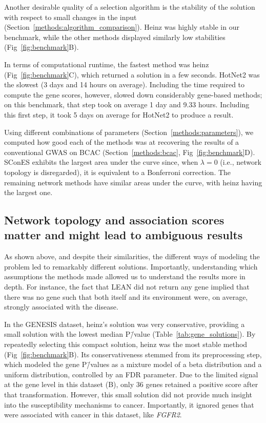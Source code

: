 \documentclass[10pt,letterpaper]{article}
\begin{document}
Another desirable quality of a selection algorithm is the stability of the solution with respect to small changes in the input (Section~\ref{methods:algorithm_comparison}). Heinz was highly stable in our benchmark, while the other methods displayed similarly low stabilities (Fig~\ref{fig:benchmark}B).

In terms of computational runtime, the fastest method was heinz (Fig~\ref{fig:benchmark}C), which returned a solution in a few seconds. HotNet2 was the slowest (3 days and 14 hours on average). Including the time required to compute the gene scores, however, slowed down considerably gene-based methods; on this benchmark, that step took on average 1 day and 9.33 hours. Including this first step, it took 5 days on average for HotNet2 to produce a result.

Using different combinations of parameters (Section~\ref{methods:parameters}), we computed how good each of the methods was at recovering the results of a conventional GWAS on BCAC (Section~\ref{methods:bcac}, Fig~\ref{fig:benchmark}D). SConES exhibits the largest area under the curve since, when $\lambda = 0$ (i.e., network topology is disregarded), it is equivalent to a Bonferroni correction. The remaining network methods have similar areas under the curve, with heinz having the largest one.

\subsection{Network topology and association scores matter and might lead to ambiguous results}
\label{results:drawbacks}

As shown above, and despite their similarities, the different ways of modeling the problem led to remarkably different solutions. Importantly, understanding which assumptions the methods made allowed us to understand the results more in depth. For instance, the fact that LEAN did not return any gene implied that there was no gene such that both itself and its environment were, on average, strongly associated with the disease.

In the GENESIS dataset, heinz's solution was very conservative, providing a small solution with the lowest median P\=/value (Table~\ref{tab:gene_solutions}). By repeatedly selecting this compact solution, heinz was the most stable method (Fig~\ref{fig:benchmark}B). Its conservativeness stemmed from its preprocessing step, which modeled the gene P\=/values as a mixture model of a beta distribution and a uniform distribution, controlled by an FDR parameter. Due to the limited signal at the gene level in this dataset (B), only 36 genes retained a positive score after that transformation. However, this small solution did not provide much insight into the susceptibility mechanisms to cancer. Importantly, it ignored genes that were associated with cancer in this dataset, like \emph{FGFR2}. 
\end{document}
